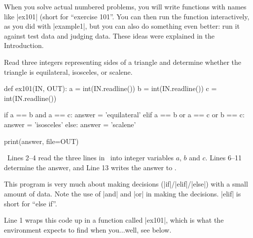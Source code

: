 When you solve actual numbered problems, you will write functions with names like
\pycode|ex101| (short for ``exercise 101''. You can then run the function interactively,
as you did with \pycode|example1|, but you can also do something even better: run it
against test data and judging data. These ideas were explained in the Introduction.


\clearpage


\Question Read three integers representing sides of a triangle and
determine whether the triangle is equilateral, isosceles, or scalene.

\Sample

               {}
               {}

\Solution

\begin{pythoncode} 
  def ex101(IN, OUT):
    a = int(IN.readline())
    b = int(IN.readline())
    c = int(IN.readline())

    if a == b and a == c:
      answer = 'equilateral'
    elif a == b or a == c or b == c:
      answer = 'isosceles'
    else:
      answer = 'scalene'

    print(answer, file=OUT)
\end{pythoncode}

\Explanation\ Lines 2--4 read the three lines in \IN\ into integer variables $a$, $b$ and
$c$. Lines 6--11 determine the answer, and Line 13 writes the answer to \OUT.

This program is very much about making decisions (\pycode|if|/\pycode|elif|/\pycode|else|)
with a small amount of data. Note the use of \pycode|and| and \pycode|or| in making the
decisions. \pycode|elif| is short for ``else if''.

Line 1 wraps this code up in a function called \pycode|ex101|, which is what the
\learninformatics{} environment expects to find when you...well, see below.

\Running


